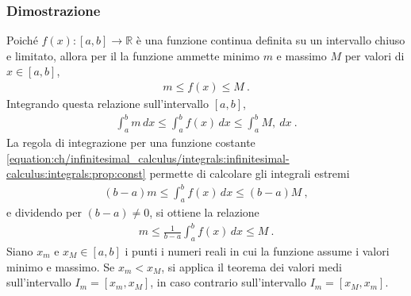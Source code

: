 \documentclass[letterpaper,10pt,italian]{jupyterBook}
\begin{document}
\subsubsection*{Dimostrazione}

\sphinxAtStartPar
Poiché \(f(x): [a,b] \rightarrow \mathbb{R}\) è una funzione continua definita su un intervallo chiuso e limitato, allora per il {\hyperref[\detokenize{ch/infinitesimal_calculus/analysis:infinitesimal-calculus-continuous-fun-thms-weierstrass}]{}} la funzione ammette minimo \(m\) e massimo \(M\) per valori di \(x \in [a,b]\),
\begin{equation*}
\begin{split}m \le f(x) \le M \ .\end{split}
\end{equation*}
\sphinxAtStartPar
Integrando questa relazione sull’intervallo \([a,b]\),
\begin{equation*}
\begin{split}\int_{a}^{b} m \, dx \le \int_{a}^{b} f(x) \, dx \le \int_{a}^{b} M ,\ dx \ .\end{split}
\end{equation*}
\sphinxAtStartPar
La regola di integrazione per una funzione costante \eqref{equation:ch/infinitesimal_calculus/integrals:infinitesimal-calculus:integrals:prop:const} permette di calcolare gli integrali estremi
\begin{equation*}
\begin{split}(b-a) m \le \int_{a}^{b} f(x) \, dx \le (b-a) M \ ,\end{split}
\end{equation*}
\sphinxAtStartPar
e dividendo per \((b-a) \ne 0\), si ottiene la relazione
\begin{equation*}
\begin{split}m \le \frac{1}{b-a} \int_{a}^{b} f(x) \, dx \le M \ .\end{split}
\end{equation*}
\sphinxAtStartPar
Siano \(x_m\) e \(x_M \in [a,b]\) i punti \sphinxhyphen{} i numeri reali \sphinxhyphen{} in cui la funzione assume i valori minimo e massimo. Se \(x_m < x_M\), si applica il teorema dei valori medi sull’intervallo \(I_m = [x_m, x_M]\), in caso contrario sull’intervallo \(I_m = [x_M, x_m]\).
\end{document}

